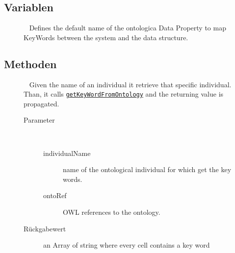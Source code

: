 \subsection{Variablen}
\begin{description}
\item[{\label{ontologyFramework.OFDataMapping.ReservatedDataType.KeyWordsMapper.KEYWORD_propName}}]
~ Defines the default name of the ontologica Data Property
 to map KeyWords between the system and the data structure.
\end{description}
\subsection{Methoden}
\begin{description}
\item[{\label{ontologyFramework.OFDataMapping.ReservatedDataType.KeyWordsMapper.getKeyWordFromOntology(java.lang.String,ontologyFramework.OFContextManagement.OWLReferences)}}]
~ Given the name of an individual it retrieve that specific
 individual. Than, it calls \texttt{\hyperlink{ontologyFramework.OFDataMapping.ReservatedDataType.KeyWordsMapper.getKeyWordFromOntology(org.semanticweb.owlapi.model.OWLNamedIndividual,ontologyFramework.OFContextManagement.OWLReferences)}{getKeyWordFromOntology}}
 and the returning value is propagated.
\begin{description}
\item[Parameter] ~
\begin{description}
\item[individualName]
name of the ontological individual for which get the key words.
\item[ontoRef]
OWL references to the ontology.
\end{description}
\item[Rückgabewert] 
an Array of string where every cell contains a key word
\end{description}
\item[{\label{ontologyFramework.OFDataMapping.ReservatedDataType.KeyWordsMapper.getKeyWordFromOntology(org.semanticweb.owlapi.model.OWLNamedIndividual,ontologyFramework.OFContextManagement.OWLReferences)}}]

\end{description}
